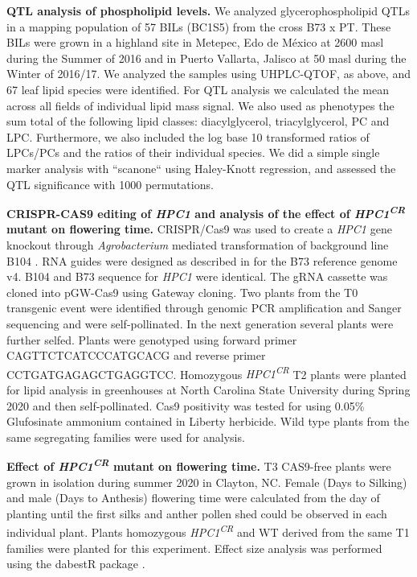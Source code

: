\documentclass[9pt,twocolumn,twoside,lineno]{BioRxiv}
\begin{document}
\textbf{QTL analysis of phospholipid levels.}
We analyzed glycerophospholipid QTLs in a mapping population of 57 BILs (BC1S5) from the cross B73 x PT.
These BILs were grown in a highland site in Metepec, Edo de México at 2600 masl during the Summer of 2016 and in Puerto Vallarta, Jalisco at 50 masl during the Winter of 2016/17.  
We analyzed the samples using UHPLC-QTOF, as above, and 67 leaf lipid species were identified.
For QTL analysis we calculated the mean across all fields of individual lipid mass signal. 
We also used as phenotypes the sum total of the following lipid classes: diacylglycerol, triacylglycerol, PC and  LPC.  
Furthermore,  we also included the log base 10 transformed ratios of LPCs/PCs and the ratios of their individual species. 
We did a simple single marker analysis  with ``scanone`` using Haley-Knott  regression, and assessed the QTL significance with 1000 permutations.

\textbf{CRISPR-CAS9 editing of \textit{HPC1} and analysis of the effect of \textit{HPC1\textsuperscript{CR}} mutant on flowering time.}
CRISPR/Cas9 was used to create a \textit{HPC1} gene knockout through \textit{Agrobacterium} mediated transformation of background line B104 \cite{Wu2020-nq, Char2017-uk}. 
RNA guides were designed as described in \cite{Brazelton2015-co} for the B73 reference genome v4. 
B104 and B73 sequence for \textit{HPC1} were identical. 
The gRNA cassette was cloned into pGW-Cas9 using Gateway cloning. 
Two plants from the T0 transgenic event were identified through genomic PCR amplification and Sanger sequencing and were self-pollinated. 
In the next generation several plants were further selfed.
Plants were genotyped using forward primer CAGTTCTCATCCCATGCACG and reverse primer CCTGATGAGAGCTGAGGTCC.
Homozygous \textit{HPC1\textsuperscript{CR}} T2 plants were  planted for lipid analysis in greenhouses at  North Carolina State University during Spring 2020 and then self-pollinated. 
Cas9 positivity was tested for using 0.05\% Glufosinate ammonium contained in Liberty herbicide. 
Wild type plants from the same segregating families were used for analysis.

\textbf{Effect of \textit{HPC1\textsuperscript{CR}} mutant on flowering time.}
T3 CAS9-free plants were grown in isolation during summer 2020 in Clayton, NC. 
Female (Days to Silking) and male (Days to Anthesis) flowering time were calculated from the day of planting until the first silks and anther pollen shed could be observed in each individual plant. 
Plants homozygous \textit{HPC1\textsuperscript{CR}} and WT derived from the same T1 families were planted for this experiment. 
Effect size analysis was performed using the dabestR package \cite{Ho2019-yl}.
\end{document}

